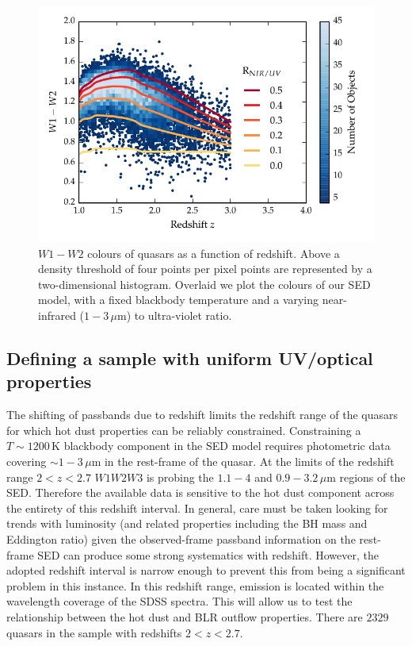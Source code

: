 \begin{figure}[t!]
\centering
\includegraphics[width=\columnwidth]{figures/chapter05/w1w2_versus_redshift_ratio.pdf}
\caption[{$W1 - W2$ colours of quasars as a function of redshift.}]{$W1 - W2$ colours of quasars as a function of redshift. Above a density threshold of four points per pixel points are represented by a two-dimensional histogram. Overlaid we plot the colours of our SED model, with a fixed blackbody temperature and a varying near-infrared ($1 - 3$\,$\mu$m) to ultra-violet ratio.}
  \label{fig:w1w2colorsratio}
\end{figure}

\subsection{Defining a sample with uniform UV/optical properties}
\label{sec:ch5-hotdustsample}

The shifting of passbands due to redshift limits the redshift range of the quasars for which hot dust properties can be reliably constrained.
Constraining a $T\sim1200$\,K blackbody component in the SED model requires photometric data covering $\sim1-3$\,$\mu$m in the rest-frame of the quasar. 
At the limits of the redshift range $2 < z < 2.7$ $W1W2W3$ is probing the $1.1-4$ and $0.9-3.2$\,$\mu$m regions of the SED. 
Therefore the available data is sensitive to the hot dust component across the entirety of this redshift interval. 
In general, care must be taken looking for trends with luminosity (and related properties including the BH mass and Eddington ratio) given the observed-frame passband information on the rest-frame SED can produce some strong systematics with redshift.
However, the adopted redshift interval is narrow enough to prevent this from being a significant problem in this instance. 
In this redshift range,  emission is located within the wavelength coverage of the SDSS spectra.
This will allow us to test the relationship between the hot dust and BLR outflow properties. 
There are $2329$ quasars in the sample with redshifts $2 < z < 2.7$. 

